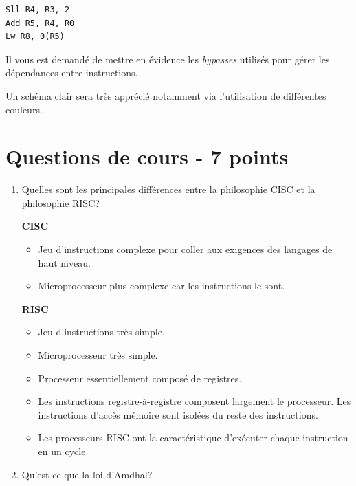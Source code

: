 \begin{verbatim}
Sll R4, R3, 2
Add R5, R4, R0
Lw R8, 0(R5)
\end{verbatim}

Il vous est demand\'e de mettre en \'evidence les \textit{bypasses} utilis\'es
pour g\'erer les d\'ependances entre instructions.

Un sch\'ema clair sera tr\`es appr\'eci\'e notamment via l'utilisation
de diff\'erentes couleurs.

%
%

\section{Questions de cours - 7 points}

\begin{enumerate}
  \item
    Quelles sont les principales diff\'erences entre la philosophie CISC
    et la philosophie RISC?

    \begin{correction}

      \textbf{CISC}

      \begin{itemize}
	\item
	  Jeu d'instructions complexe pour coller aux exigences des
	  langages de haut niveau.
	\item
	  Microprocesseur plus complexe car les instructions le sont.
      \end{itemize}

      \textbf{RISC}

      \begin{itemize}
	\item
	  Jeu d'instructions tr\`es simple.
	\item
	  Microprocesseur tr\`es simple.
	\item
	  Processeur essentiellement compos\'e de registres.
	\item
	  Les instructions registre-\`a-registre composent largement le
	  processeur. Les instructions d'acc\`es m\'emoire sont isol\'ees du
	  reste des instructions.
	\item
	  Les processeurs RISC ont la caract\'eristique d'ex\'ecuter chaque
	  instruction en un cycle.
      \end{itemize}

    \end{correction}
  \item
    Qu'est ce que la loi d'Amdhal?


\end{enumerate}
